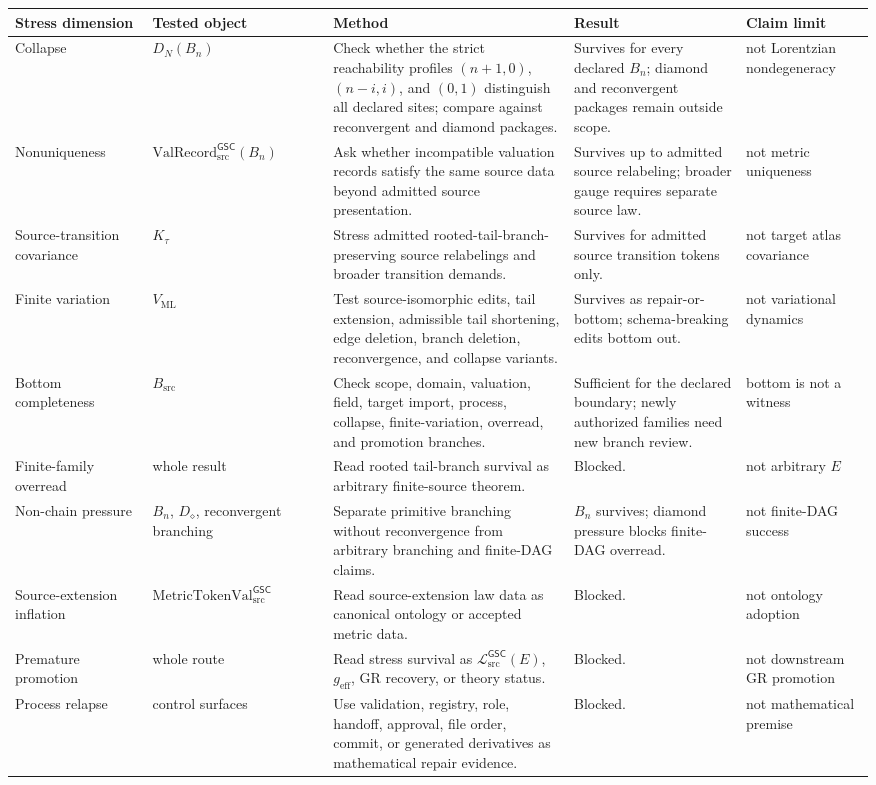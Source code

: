 \documentclass[11pt]{article}
\newcommand{\MetricTokenVal}{\mathrm{MetricTokenVal}_{\mathrm{src}}^{\mathsf{GSC}}}
\newcommand{\MetricData}{\mathcal{L}_{\mathrm{src}}^{\mathsf{GSC}}}
\newcommand{\ValRecord}{\mathrm{ValRecord}_{\mathrm{src}}^{\mathsf{GSC}}}
\newcommand{\geff}{g_{\mathrm{eff}}}
\newcommand{\Bn}{B_n}
\newcommand{\Diamond}{D_{\diamond}}
\begin{document}
\begin{longtable}{p{0.16\linewidth}p{0.21\linewidth}p{0.28\linewidth}p{0.20\linewidth}p{0.15\linewidth}}
\toprule
Stress dimension & Tested object & Method & Result & Claim limit \\
\midrule
Collapse &
\(D_N(\Bn)\) &
Check whether the strict reachability profiles
\((n+1,0)\), \((n-i,i)\), and \((0,1)\) distinguish all declared sites;
compare against reconvergent and diamond packages. &
Survives for every declared \(\Bn\); diamond and reconvergent packages remain
outside scope. &
not Lorentzian nondegeneracy \\
Nonuniqueness &
\(\ValRecord(\Bn)\) &
Ask whether incompatible valuation records satisfy the same source data
beyond admitted source presentation. &
Survives up to admitted source relabeling; broader gauge requires separate
source law. &
not metric uniqueness \\
Source-transition covariance &
\(K_{\tau}\) &
Stress admitted rooted-tail-branch-preserving source relabelings and broader
transition demands. &
Survives for admitted source transition tokens only. &
not target atlas covariance \\
Finite variation &
\(V_{\mathrm{ML}}\) &
Test source-isomorphic edits, tail extension, admissible tail shortening,
edge deletion, branch deletion, reconvergence, and collapse variants. &
Survives as repair-or-bottom; schema-breaking edits bottom out. &
not variational dynamics \\
Bottom completeness &
\(B_{\mathrm{src}}\) &
Check scope, domain, valuation, field, target import, process, collapse,
finite-variation, overread, and promotion branches. &
Sufficient for the declared boundary; newly authorized families need new
branch review. &
bottom is not a witness \\
Finite-family overread &
whole result &
Read rooted tail-branch survival as arbitrary finite-source theorem. &
Blocked. &
not arbitrary \(E\) \\
Non-chain pressure &
\(\Bn\), \(\Diamond\), reconvergent branching &
Separate primitive branching without reconvergence from arbitrary branching
and finite-DAG claims. &
\(\Bn\) survives; diamond pressure blocks finite-DAG overread. &
not finite-DAG success \\
Source-extension inflation &
\(\MetricTokenVal\) &
Read source-extension law data as canonical ontology or accepted metric data. &
Blocked. &
not ontology adoption \\
Premature promotion &
whole route &
Read stress survival as \(\MetricData(E)\), \(\geff\), GR recovery, or theory
status. &
Blocked. &
not downstream GR promotion \\
Process relapse &
control surfaces &
Use validation, registry, role, handoff, approval, file order, commit, or
generated derivatives as mathematical repair evidence. &
Blocked. &
not mathematical premise \\
\bottomrule
\end{longtable}
\end{document}
